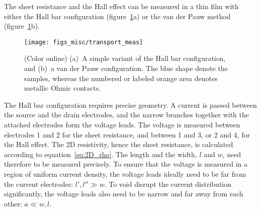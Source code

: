 The sheet resistance and the Hall effect can be measured in a thin film with either the Hall bar configuration (figure~\ref{fig:transport_meas}a) or the van der Pauw method (figure~\ref{fig:transport_meas}b).%
\begin{figure}[ht]%
	\centering%
    \texttt{[image: figs\_misc/transport\_meas]}%
    \caption[Hall bar and van der Pauw configuration]{\label{fig:transport_meas}(Color online) (a)~A simple variant of the Hall bar configuration, and (b)~a van der Pauw configuration. The blue shape denote the samples, whereas the numbered or labeled orange area denotes metallic Ohmic contacts.}%
\end{figure}%

The Hall bar configuration requires precise geometry. A current is passed between the source and the drain electrodes, and the narrow branches together with the attached electrodes form the voltage leads. The voltage is measured between electrodes 1 and 2 for the sheet resistance, and between 1 and 3, or 2 and 4, for the Hall effect. The 2D resistivity, hence the sheet resistance, is calculated according to equation~\ref{eq:2D_rho}. The length and the width, $l$ and $w$, need therefore to be measured precisely. To ensure that the voltage is measured in a region of uniform current density, the voltage leads ideally need to be far from the current electrodes: $l', l'' \gg w$. To void disrupt the current distribution significantly, the voltage leads also need to be narrow and far away from each other: $a \ll w, l$.

